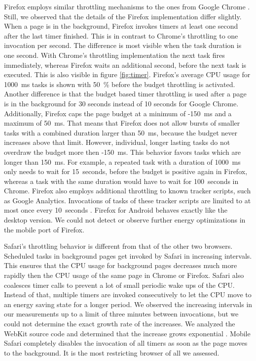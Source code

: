 \documentclass[
	ruledheaders=section,%
	class=report,%
	thesis={type=bachelor},%
	accentcolor=9c,%
	custommargins=true,%
	marginpar=false,%
	parskip=half-,%
	fontsize=11pt,%
]{tudapub}
\begin{document}
  Firefox employs similar throttling mechanisms to the ones from Google Chrome \cite{mdn-page-visibility}. Still, we observed that the details of the Firefox implementation differ slightly. When a page is in the background, Firefox invokes timers at least one second after the last timer finished. This is in contrast to Chrome's throttling to one invocation per second. The difference is most visible when the task duration is one second. With Chrome's throttling implementation the next task fires immediately, whereas Firefox waits an additional second, before the next task is executed. This is also visible in figure \ref{fig:timer}. Firefox's average CPU usage for 1000~ms tasks is shown with 50~\% before the budget throttling is activated. Another difference is that the budget based timer throttling is used after a page is in the background for 30 seconds instead of 10 seconds for Google Chrome. Additionally, Firefox caps the page budget at a minimum of -150~ms and a maximum of 50~ms. That means that Firefox does not allow bursts of smaller tasks with a combined duration larger than 50~ms, because the budget never increases above that limit. However, individual, longer lasting tasks do not overdraw the budget more then -150~ms. This behavior favors tasks which are longer than 150~ms. For example, a repeated task with a duration of 1000~ms only needs to wait for 15~seconds, before the budget is positive again in Firefox, whereas a task with the same duration would have to wait for 100~seconds in  Chrome. Firefox also employs additional throttling to known tracker scripts, such as Google Analytics. Invocations of tasks of these tracker scripts are limited to at most once every 10~seconds \cite{mdn-tracker-throttling}. Firefox for Android behaves exactly like the desktop version. We could not detect or observe further energy optimizations in the mobile port of Firefox. 

  Safari's throttling behavior is different from that of the other two browsers. Scheduled tasks in background pages get invoked by Safari in increasing intervals. This ensures that the CPU usage for background pages decreases much more rapidly then the CPU usage of the same page in Chrome or Firefox. Safari also coalesces timer calls to prevent a lot of small periodic wake ups of the CPU. Instead of that, multiple timers are invoked consecutively to let the CPU move to an energy saving state for a longer period. We observed the increasing intervals in our measurements up to a limit of three minutes between invocations, but we could not determine the exact growth rate of the increases. We analyzed the WebKit source code and determined that the increase grows exponential \cite{webkit-timer-increases}. Mobile Safari completely disables the invocation of all timers as soon as the page moves to the background. It is the most restricting browser of all we assessed.
  
\end{document}
